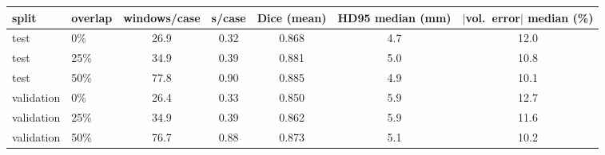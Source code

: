 \begin{tabular}{llccccc}
\toprule
split & overlap & windows/case & s/case & Dice (mean) & HD95 median (mm) & $|$vol.\ error$|$ median (\%) \\
\midrule
test & 0\% & 26.9 & 0.32 & 0.868 & 4.7 & 12.0 \\
test & 25\% & 34.9 & 0.39 & 0.881 & 5.0 & 10.8 \\
test & 50\% & 77.8 & 0.90 & 0.885 & 4.9 & 10.1 \\
validation & 0\% & 26.4 & 0.33 & 0.850 & 5.9 & 12.7 \\
validation & 25\% & 34.9 & 0.39 & 0.862 & 5.9 & 11.6 \\
validation & 50\% & 76.7 & 0.88 & 0.873 & 5.1 & 10.2 \\
\bottomrule
\end{tabular}